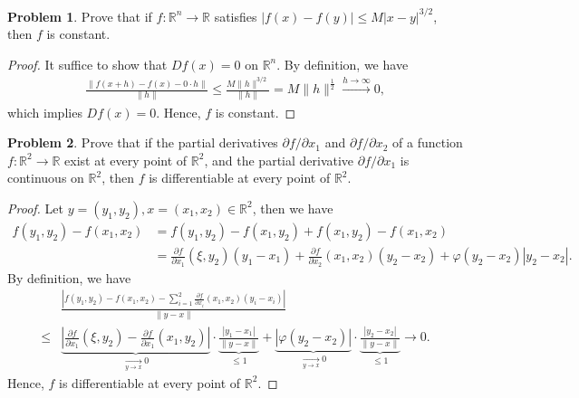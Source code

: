 \documentclass[11pt]{article}
\theoremstyle{definition}
\newtheorem{problem}{Problem}
\theoremstyle{definition}
\begin{document}
\medskip

\begin{problem}
Prove that if $f:\mathbb{R}^n\to\mathbb{R}$ satisfies $\left|f(x) - f(y)\right| \leq M \left|x - y\right|^{3/2}$, then $f$ is constant.
\end{problem}
\begin{proof}
It suffice to show that $Df(x) = 0$ on $\mathbb{R}^n$. By definition, we have 
\begin{align*}
    \frac{\|f(x+h) - f(x) - 0\cdot h\|}{\|h\|} \leq \frac{M \|h\|^{3/2}}{\|h\|} = M \|h\|^{\frac{1}{2}} \xrightarrow[]{h\to\infty} 0,
\end{align*}
which implies $Df(x) = 0$. Hence, $f$ is constant.
\end{proof}


\medskip

\begin{problem}
Prove that if the partial derivatives $\partial f/\partial x_1$ and $\partial f/\partial x_2$  of a function $f:\mathbb{R}^2\to\mathbb{R}$ exist at every point of
$\mathbb{R}^2$, and the partial derivative $\partial f/\partial x_1$ is continuous on $\mathbb{R}^2$, then $f$ is differentiable at every point of $\mathbb{R}^2$.
\end{problem}
\begin{proof}
Let $y = (y_1, y_2), x = (x_1, x_2) \in \mathbb{R}^2$, then we have
\begin{align*}
    f(y_1, y_2) - f(x_1, x_2) & = f(y_1, y_2) - f(x_1, y_2) + f(x_1, y_2) - f(x_1, x_2) \\
    & = \frac{\partial f}{\partial x_1}(\xi, y_2) (y_1 - x_1) + \frac{\partial f}{\partial x_2}(x_1,x_2)(y_2 - x_2) + \varphi(y_2 - x_2)|y_2 - x_2|.
\end{align*}
By definition, we have
\begin{align*}
    & \frac{\left|f(y_1, y_2) - f(x_1, x_2) - \sum^2_{i=1}\frac{\partial f}{\partial x_i}(x_1, x_2)(y_i - x_i) \right|}{\|y - x\|} \\
    \leq & \underbrace{\left|\frac{\partial f}{\partial x_1}(\xi, y_2) - \frac{\partial f}{\partial x_1}(x_1, y_2)\right|}_{\xrightarrow[y\to x]{} 0}\cdot \underbrace{\frac{|y_1 - x_1|}{\|y - x\|}}_{\leq 1} + \underbrace{|\varphi(y_2 - x_2)|}_{\xrightarrow[y\to x]{} 0} \cdot \underbrace{\frac{|y_2 - x_2|}{\|y - x\|}}_{\leq 1} \to 0.
\end{align*}
Hence, $f$ is differentiable at every point of $\mathbb{R}^2$.
\end{proof}
\end{document}
